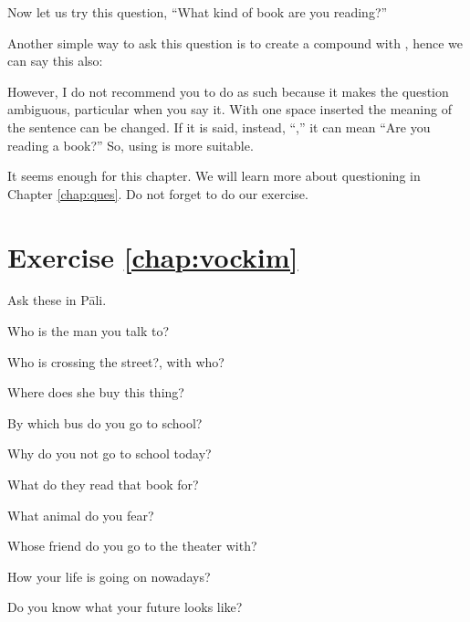 Now let us try this question, ``What kind of book are you reading?''


Another simple way to ask this question is to create a compound with , hence we can say this also:


However, I do not recommend you to do as such because it makes the question ambiguous, particular when you say it. With one space inserted the meaning of the sentence can be changed. If it is said, instead, ``,'' it can mean ``Are you reading a book?'' So, using  is more suitable.

It seems enough for this chapter. We will learn more about questioning in Chapter \ref{chap:ques}. Do not forget to do our exercise.

\section*{Exercise \ref{chap:vockim}}
Ask these in P\=ali.
\begin{compactenum}
\item Who is the man you talk to?
\item Who is crossing the street?, with who?
\item Where does she buy this thing?
\item By which bus do you go to school?
\item Why do you not go to school today?
\item What do they read that book for?
\item What animal do you fear?
\item Whose friend do you go to the theater with?
\item How your life is going on nowadays?
\item Do you know what your future looks like?
\end{compactenum}

